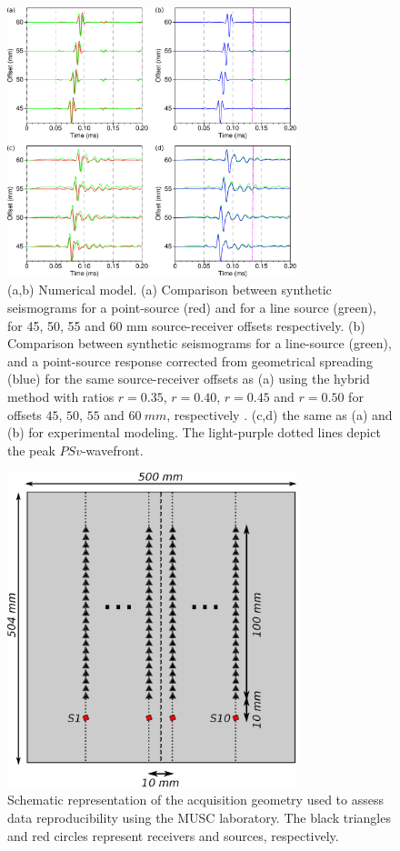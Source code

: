 \documentclass[manuscript,revised]{geophysics}
\begin{document}
\begin{figure}[!h]
\centering
\includegraphics[width=0.75\textwidth]{fig/trans2d3d.eps}
\caption{(a,b) Numerical model. (a) Comparison between synthetic seismograms for a point-source (red) and for a line source (green), for 45, 50, 55 and 60 mm source-receiver offsets respectively. (b) Comparison between synthetic seismograms for a line-source (green), and a point-source response corrected from geometrical spreading (blue) for the same source-receiver offsets as (a) using the hybrid method with ratios $r=0.35$, $r=0.40$, $r=0.45$ and $r=0.50$ for offsets $45$, $50$, $55$ and $60\ mm$, respectively . (c,d) the same as (a) and (b) for experimental modeling. The light-purple dotted lines depict the peak $PSv$-wavefront.}%
\label{panel_amplitude_sem}
\end{figure}

\begin{figure}[!h]
\centering
\includegraphics[width=0.75\textwidth]{fig/reproducibility_acqui_principle.eps}
\caption{Schematic representation of the acquisition geometry used to assess data reproducibility using the MUSC laboratory. The black triangles and red circles represent receivers and sources, respectively.}
\label{reproducibility_acqui_principle}
\end{figure}
\end{document}
